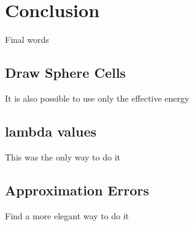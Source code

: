 \chapter{Conclusion}
Final words

\section{Draw Sphere Cells}
It is also possible to use only the effective energy

\section{lambda values}
This was the only way to do it

\section{Approximation Errors}
Find a more elegant way to do it
